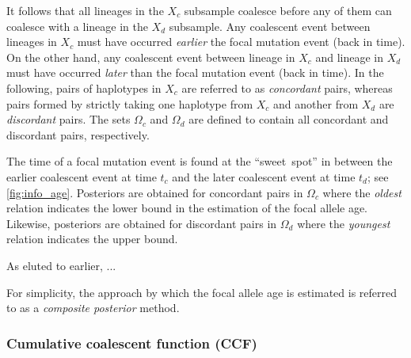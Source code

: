 %

%

It follows that all lineages in the $X_c$ subsample coalesce before any of them can coalesce with a lineage in the $X_d$ subsample.
Any coalescent event between  lineages in $X_c$ must have occurred \emph{earlier}  the focal mutation event (back in time).
On the other hand, any coalescent event between  lineage in $X_c$ and  lineage in $X_d$ must have occurred \emph{later} than the focal mutation event (back in time).
In the following, pairs of haplotypes in $X_c$ are referred to as \emph{concordant} pairs, whereas pairs formed by strictly taking one haplotype from $X_c$ and another from $X_d$ are \emph{discordant} pairs.
The sets $\Omega_c$ and $\Omega_d$ are defined to contain all concordant and discordant pairs, respectively.


The time of a focal mutation event is found at the ``sweet~spot'' in between the earlier coalescent event at time $t_c$ and the later coalescent event at time $t_d$; see \cref{fig:info_age}.
Posteriors are obtained for concordant pairs in $\Omega_c$ where the \emph{oldest} relation indicates the lower bound in the estimation of the focal allele age.
Likewise, posteriors are obtained for discordant pairs in $\Omega_d$ where the \emph{youngest} relation indicates the upper bound.

As eluted to earlier, ...


For simplicity, the approach by which the focal allele age is estimated is referred to as a \emph{composite posterior} method.

%
\subsubsection{Cumulative coalescent function (CCF)}\label{sec:ccf_desc}
%

